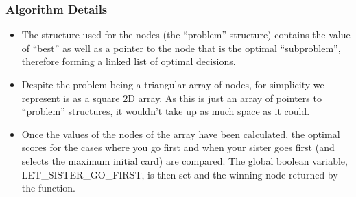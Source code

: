 \documentclass[11pt]{article}
\begin{document}
\subsubsection*{Algorithm Details}
\begin{itemize}
		\item The structure used for the nodes (the ``problem'' structure) contains the value of ``best'' as well as a pointer to the node that is the optimal ``subproblem'', therefore forming a linked list of optimal decisions.
		\item Despite the problem being a triangular array of nodes, for simplicity we represent is as a square 2D array. As this is just an array of pointers to ``problem'' structures, it wouldn't take up as much space as it could.
		\item Once the values of the nodes of the array have been calculated, the optimal scores for the cases where you go 
			first and when your sister goes first (and selects the maximum initial card) are compared. The global boolean variable, 	
			LET\_SISTER\_GO\_FIRST, is then set and the winning node returned by the function.
\end{itemize}
\end{document}
